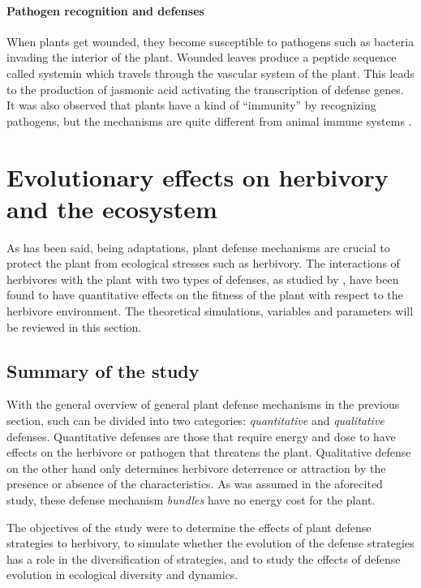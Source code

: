 \paragraph{Pathogen recognition and defenses}
When plants get wounded, they become susceptible to pathogens such as bacteria invading the interior of the plant.
Wounded leaves produce a peptide sequence called systemin which travels through the vascular system of the plant.
This leads to the production of jasmonic acid activating the transcription of defense genes.
It was also observed that plants have a kind of ``immunity'' by recognizing pathogens, but the mechanisms are quite different from animal immune systems \cite[p.799-800]{biomain}.

\section{Evolutionary effects on herbivory and the ecosystem}
As has been said, being adaptations, plant defense mechanisms are crucial to protect the plant from ecological stresses such as herbivory.
The interactions of herbivores with the plant with two types of defenses, as studied by , have been found to have quantitative effects on the fitness of the plant with respect to the herbivore environment.
The theoretical simulations, variables and parameters will be reviewed in this section.

\subsection{Summary of the study}
With the general overview of general plant defense mechanisms in the previous section, such can be divided into two categories: \emph{quantitative} and \emph{qualitative} defenses.
Quantitative defenses are those that require energy and dose to have effects on the herbivore or pathogen that threatens the plant.
Qualitative defense on the other hand only determines herbivore deterrence or attraction by the presence or absence of the characteristics.
As was assumed in the aforecited study, these defense mechanism \emph{bundles} have no energy cost for the plant.

The objectives of the study were to determine the effects of plant defense strategies to herbivory,
to simulate whether the evolution of the defense strategies has a role in the diversification of strategies,
and to study the effects of defense evolution in ecological diversity and dynamics.

